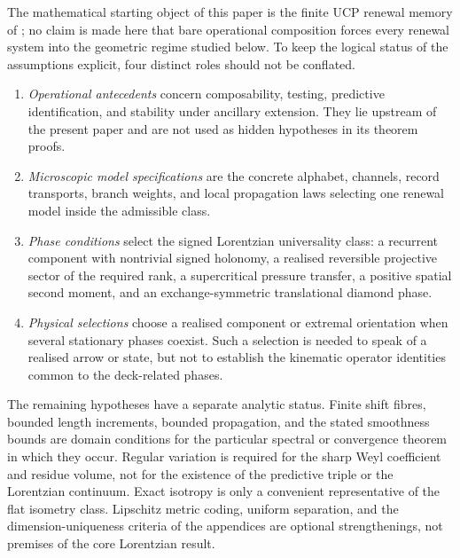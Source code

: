 \documentclass[11pt]{article}
\theoremstyle{definition}
\theoremstyle{remark}
\begin{document}
The mathematical starting object of this paper is the finite UCP renewal memory
of ; no claim is made here that bare operational
composition forces every renewal system into the geometric regime studied
below.  To keep the logical status of the assumptions explicit, four distinct
roles should not be conflated.
\begin{enumerate}[label=\textup{(\roman*)},leftmargin=2.4em]
\item \emph{Operational antecedents} concern composability, testing,
      predictive identification, and stability under ancillary extension.  They
      lie upstream of the present paper and are not used as hidden hypotheses in
      its theorem proofs.
\item \emph{Microscopic model specifications} are the concrete alphabet,
      channels, record transports, branch weights, and local propagation laws
      selecting one renewal model inside the admissible class.
\item \emph{Phase conditions} select the signed Lorentzian universality class:
      a recurrent component with nontrivial signed holonomy, a realised
      reversible projective sector of the required rank, a supercritical
      pressure transfer, a positive spatial second moment, and an
      exchange-symmetric translational diamond phase.
\item \emph{Physical selections} choose a realised component or extremal
      orientation when several stationary phases coexist.  Such a selection is
      needed to speak of a realised arrow or state, but not to establish the
      kinematic operator identities common to the deck-related phases.
\end{enumerate}

The remaining hypotheses have a separate analytic status.  Finite shift fibres,
bounded length increments, bounded propagation, and the stated smoothness
bounds are domain conditions for the particular spectral or convergence
theorem in which they occur.  Regular variation is required for the sharp Weyl
coefficient and residue volume, not for the existence of the predictive triple
or the Lorentzian continuum.  Exact isotropy is only a convenient representative
of the flat isometry class.  Lipschitz metric coding, uniform separation, and
the dimension-uniqueness criteria of the appendices are optional strengthenings,
not premises of the core Lorentzian result.
\end{document}
